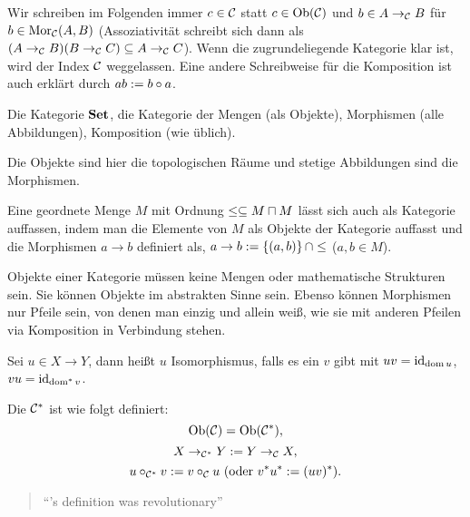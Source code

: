 \documentclass{book}
\begin{document}
\begin{remark}
    Wir schreiben im Folgenden immer $c\in\mathcal{C}$ statt $c\in\mathop\mathrm{Ob}(\mathcal{C})$ und $b\in A\rightarrow_{\mathcal{C}} B$ für $b\in\mathop\mathrm{Mor}\nolimits_{\mathcal{C}}(A,B)$ (Assoziativität schreibt sich dann als $(A\rightarrow_{\mathcal{C}} B)(B\rightarrow_{\mathcal{C}} C)\subseteq A\rightarrow_{\mathcal{C}} C$). Wenn die zugrundeliegende Kategorie klar ist, wird der Index $\mathcal{C}$ weggelassen. Eine andere Schreibweise für die Komposition ist auch erklärt durch $ab:=b\circ a$.
\end{remark}

\begin{example}
    Die Kategorie $\mathbf{Set}$, die Kategorie der Mengen (als Objekte), Morphismen (alle Abbildungen), Komposition (wie üblich).
\end{example}

\begin{example}
    Die Objekte sind hier die topologischen Räume und stetige Abbildungen sind die Morphismen.
\end{example}

\begin{example}
    Eine geordnete Menge $M$ mit Ordnung $\leq\setleq M\settimes M$ lässt sich auch als Kategorie auffassen, indem man die Elemente von $M$ als Objekte der Kategorie auffasst und die Morphismen $a\to b$ definiert als, $a\rightarrow b:=\left\{(a,b)\right\}\cap\leq$ ($a,b\in M$).
\end{example}

\begin{remark}
    Objekte einer Kategorie müssen keine Mengen oder mathematische Strukturen sein. Sie können Objekte im abstrakten Sinne sein. Ebenso können Morphismen nur Pfeile sein, von denen man einzig und allein weiß, wie sie mit anderen Pfeilen via Komposition in Verbindung stehen.
\end{remark}

\begin{definition}[Isomorphismus]
    Sei $u\in X\to Y$, dann heißt $u$ Isomorphismus, falls es ein $v$ gibt mit $uv=\mathop\mathrm{id}\nolimits_{\mathop\mathrm{dom}\nolimits u}$, $vu=\mathop\mathrm{id}\nolimits_{\mathop{\mathrm{dom}^\ast}\nolimits v}$.
\end{definition}

\begin{definition}
    Die  $\mathcal{C}^{\ast}$ ist wie folgt definiert:
    $$
    \mathop\mathrm{Ob}(\mathcal{C})=\mathop\mathrm{Ob}(\mathcal{C}^{\ast}),
    $$
    $$
    X\rightarrow_{\mathcal{C}^{\ast}} Y:=Y\rightarrow_{\mathcal{C}} X,
    $$
    $$
    u\circ_{\mathcal{C}^{\ast}} v:=v\circ_{\mathcal{C}} u\text{ (oder $v^{\ast}u^{\ast}:=(uv)^{\ast}$)}.
    $$
\end{definition}
%
\begin{quotation}
    ``'s definition was revolutionary'' 
\end{quotation}
\end{document}
